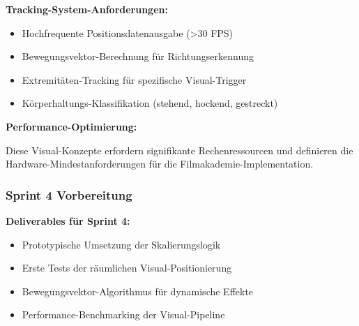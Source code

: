 \textbf{Tracking-System-Anforderungen:}
\begin{itemize}
    \item Hochfrequente Positionsdatenausgabe (>30 FPS)
    \item Bewegungsvektor-Berechnung für Richtungserkennung
    \item Extremitäten-Tracking für spezifische Visual-Trigger
    \item Körperhaltungs-Klassifikation (stehend, hockend, gestreckt)
\end{itemize}

\textbf{Performance-Optimierung:}
\raggedright Diese Visual-Konzepte erfordern signifikante Rechenressourcen und definieren die Hardware-Mindestanforderungen für die Filmakademie-Implementation.

\subsubsection{Sprint 4 Vorbereitung}

\textbf{Deliverables für Sprint 4:}
\begin{itemize}
    \item Prototypische Umsetzung der Skalierungslogik
    \item Erste Tests der räumlichen Visual-Positionierung
    \item Bewegungsvektor-Algorithmus für dynamische Effekte
    \item Performance-Benchmarking der Visual-Pipeline
\end{itemize}